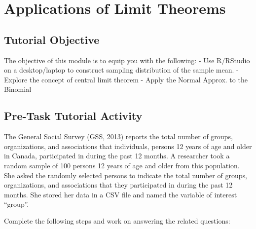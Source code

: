 \documentclass[oneside,openany]{book}
\begin{document}
\chapter{Applications of Limit Theorems}\label{activity-4---applications-of-limit-theorems}

\section{Tutorial Objective}\label{tutorial-objective-1}

The objective of this module is to equip you with the following:
- Use R/RStudio on a desktop/laptop to construct sampling distribution of the sample mean.
- Explore the concept of central limit theorem
- Apply the Normal Approx. to the Binomial

\section{Pre-Task Tutorial Activity}\label{pre-task-tutorial-activity}

The General Social Survey (GSS, 2013) reports the total number of groups, organizations, and associations that individuals, persons 12 years of age and older in Canada, participated in during the past 12 months. A researcher took a random sample of 100 persons 12 years of age and older from this population. She asked the randomly selected persons to indicate the total number of groups, organizations, and associations that they participated in during the past 12 months. She stored her data in a CSV file and named the variable of interest ``group''.

Complete the following steps and work on answering the related questions:
\end{document}
